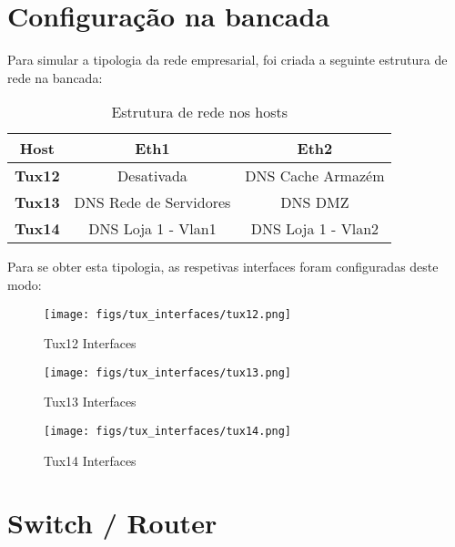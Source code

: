\section{Configuração na bancada} \label{bench_conf}

Para simular a tipologia da rede empresarial, foi criada a seguinte estrutura de rede na bancada:

\begin{table}[H]
    \begin{center}
        \begin{tabular}{ | c | c | c | }
        \hline
        \textbf{Host} & \textbf{Eth1} & \textbf{Eth2}\\ 
        \hline
        \textbf{Tux12} & Desativada & DNS Cache Armazém\\ 
        \hline
        \textbf{Tux13} & DNS Rede de Servidores & DNS DMZ\\ 
        \hline
        \textbf{Tux14} & DNS Loja 1 - Vlan1 & DNS Loja 1 - Vlan2\\ 
        \hline
        \end{tabular}
    \end{center}
    \caption{Estrutura de rede nos hosts}
    \label{tab:tux_table}
\end{table}

Para se obter esta tipologia, as respetivas interfaces foram configuradas deste modo:

\begin{figure}[H]
    \centering
    \texttt{[image: figs/tux\_interfaces/tux12.png]}
    \caption{Tux12 Interfaces}
    \label{fig:tux12}
\end{figure}

\begin{figure}[H]
    \centering
    \texttt{[image: figs/tux\_interfaces/tux13.png]}
    \caption{Tux13 Interfaces}
    \label{fig:tux13}
\end{figure}

\begin{figure}[H]
    \centering
    \texttt{[image: figs/tux\_interfaces/tux14.png]}
    \caption{Tux14 Interfaces}
    \label{fig:tux14}
\end{figure}

\section{Switch / Router} \label{switch_router}

